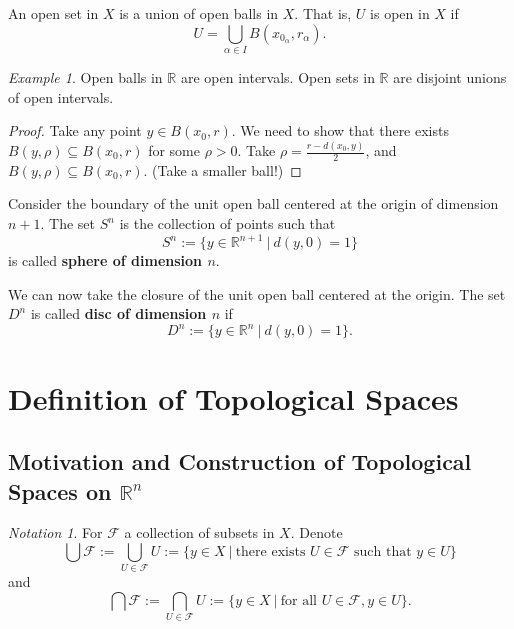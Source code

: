 \documentclass[article,11pt, reqno]{article}
\newtheorem*{proposition}{Proposition}
\theoremstyle{remark}
\newtheorem*{example}{Example}
\newtheorem*{notation}{Notation}
\newcommand{\tb}{\textbf}
\newcommand{\mb}{\mathbb}
\newcommand{\mc}{\mathcal}
\newcommand{\<}{\langle}
\renewcommand{\>}{\rangle}
\begin{document}
An open set in $X$ is a union of open balls in $X$. That is, $U$ is open in $X$ if 
$$U=\bigcup_{\alpha\in I} B(x_{0_\alpha},r_\alpha).$$
\begin{example}
    Open balls in $\mb R$ are open intervals. Open sets in $\mb R$ are disjoint unions of open intervals.
\end{example}
\noindent
{}
\begin{proof}
    Take any point $y\in B(x_0,r)$. We need to show that there exists $B(y,\rho)\subseteq B(x_0,r)$ for some $\rho>0$. Take $\rho=\frac{r-d(x_0,y)}{2}$, and $B(y,\rho)\subseteq B(x_0,r)$. (Take a smaller ball!)
\end{proof}

Consider the boundary of the unit open ball centered at the origin of dimension $n+1$. 
The set $S^n$ is the collection of points such that 
$$S^n:=\{y\in\mb R^{n+1}\ | \ d(y, 0)=1\}$$
is called \tb{sphere of dimension $n$}.

We can now take the closure of the unit open ball centered at the origin.
The set $D^n$ is called \tb{disc of dimension $n$} if
$$D^n:=\{y\in\mb R^{n}\ | \ d(y, 0)=1\}.$$


\section{Definition of Topological Spaces}
\subsection*{Motivation and Construction of Topological Spaces on $\mb R^n$}
\begin{notation}
    For $\mc F$ a collection of subsets in $X$. Denote
    $$\bigcup\mc F:=\bigcup_{U\in\mc F} U:=\{y\in X\ |\ \text{there exists } U\in\mc F \text{ such that } y\in U\}$$
    and
    $$\bigcap\mc F:=\bigcap_{U\in\mc F} U:=\{y\in X\ |\ \text{for all } U\in\mc F, y\in U\}.$$
\end{notation}
\end{document}
